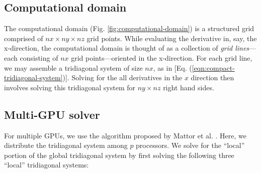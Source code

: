 \documentclass{elsarticle}
\begin{document}
\subsection{Computational domain}

The computational domain (Fig. \ref{fig:computational-domain})
is a structured grid comprised of
$nx \times ny \times nz$ grid points.
While evaluating the derivative in, say, the x-direction,
the computational domain is thought of as
a collection of \emph{grid lines}---each consisting of
$nx$ grid points---oriented in the x-direction.
For each grid line,
we may assemble a tridiagonal system of size $nx$, as in
[Eq. (\ref{eqn:compact-tridiagonal-system})].
Solving for the all derivatives in the $x$ direction then involves
solving this tridiagonal system for $ny \times nz$ right hand sides.

\subsection{Multi-GPU solver}

For multiple GPUs, we use the algorithm
proposed by Mattor et al. \cite{mattor1995algorithm}.
Here, we distribute the tridiagonal system among
$p$ processors.
We solve for the ``local''  
portion of the global tridiagonal system
by first solving the following three ``local''
tridiagonal systems:
\end{document}
